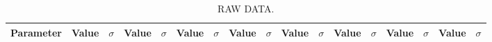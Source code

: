 \documentclass[../../../papers/report/parameterReport.tex]{subfiles}
\begin{document}
\begin{landscape}
\begin{table}[tb]
\begin{center}
\caption{RAW DATA.}
{\small
\begin{tabular}{l|rr|rr|rr|rr|rr|rr|rr|rr}
Parameter & Value & $\sigma$ & Value & $\sigma$
          & Value & $\sigma$ & Value & $\sigma$
          & Value & $\sigma$ & Value & $\sigma$
          & Value & $\sigma$ & Value & $\sigma$\\
\hline

\end{tabular}
}
\end{center}
\end{table}
\end{landscape}
\end{document}
